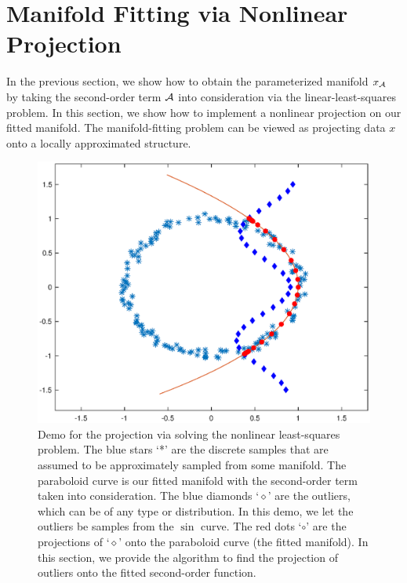 \documentclass{article}
\theoremstyle{remark}
\begin{document}
\section{Manifold Fitting via Nonlinear Projection}
In the previous section, we show how to obtain the parameterized manifold $x_{\cal A}$ by taking the second-order term $\cal A$ into consideration via the linear-least-squares problem. In this section, we show how to implement a nonlinear projection on our fitted manifold. %
The manifold-fitting problem can be viewed as projecting data $x$ onto a locally approximated structure. 
\begin{figure}[ht] %
   \centering
   \includegraphics[width=0.8\linewidth]{demo3.eps} 
   \vspace{-0.4cm}
   \begin{small}
   \caption{\small Demo for the projection via solving the nonlinear least-squares problem. The blue stars `*' are the discrete samples that are assumed to be approximately sampled from some manifold. The paraboloid curve is our fitted manifold with the second-order term taken into consideration. The blue diamonds `$\diamond$' are the outliers, which can be of any type or distribution. In this demo, we let the outliers be samples from the $\sin$ curve. The red dots `$\circ$' are the projections of `$\diamond$' onto the paraboloid curve (the fitted manifold). In this section, we provide the algorithm to find the projection of outliers onto the fitted second-order function.}
   \end{small}
   \label{fig:demo}
\end{figure}
\end{document}
